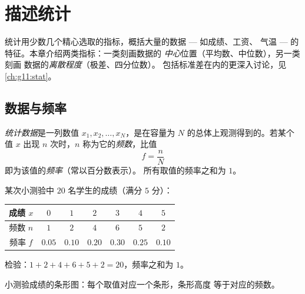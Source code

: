 \chapter{描述统计}\label{ch:g10:stats}

统计用少数几个精心选取的指标，概括大量的数据 --- 如成绩、工资、
气温 --- 的特征。本章介绍两类指标：一类刻画数据的
\emph{中心}位置（平均数、中位数），另一类刻画
数据的\emph{离散程度}（极差、四分位数）。
包括标准差在内的更深入讨论，见
\cref{ch:g11:stat}。

\section{数据与频率}

\begin{definition}[统计数据]\label{def:g10:stats:series}
\emph{统计数据}是一列数值
$x_1, x_2, \dots, x_N$，是在容量为 $N$ 的总体上观测得到的。若某个值
$x$ 出现 $n$ 次时，$n$ 称为它的\emph{频数}，比值
\[
f = \frac{n}{N}
\]
即为该值的\emph{频率}（常以百分数表示）。
所有取值的频率之和为 $1$。
\end{definition}

\begin{example}\label{ex:g10:stats:frequencies}
某次小测验中 $20$ 名学生的成绩（满分 $5$ 分）：
\begin{center}
\renewcommand{\arraystretch}{1.2}
\begin{tabular}{c|cccccc}
成绩 $x$ & $0$ & $1$ & $2$ & $3$ & $4$ & $5$ \\
\hline
频数 $n$ & $1$ & $2$ & $4$ & $6$ & $5$ & $2$ \\
频率 $f$ & $0.05$ & $0.10$ & $0.20$ & $0.30$ & $0.25$ & $0.10$ \\
\end{tabular}
\end{center}
检验：$1 + 2 + 4 + 6 + 5 + 2 = 20$，频率之和为 $1$。
\end{example}

\begin{omfigure}

{\small 小测验成绩的条形图：每个取值对应一个条形，条形高度
等于对应的频数。}
\end{omfigure}

